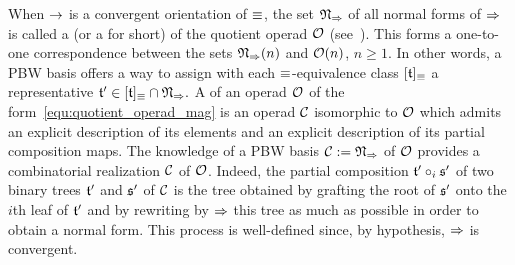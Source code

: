 When $\operatorname{\to}$ is a convergent orientation of $\operatorname{\equiv}$, the set
$\mathfrak{N}_{\operatorname{\Rightarrow}}$ of all normal forms of $\operatorname{\Rightarrow}$ is
called a  (or a  for
short) of the quotient operad $\mathcal{O}$ (see~\cite{Hof10,DK10}). This forms
a one-to-one correspondence between the sets
$\mathfrak{N}_{\operatorname{\Rightarrow}}(n)$ and $\mathcal{O}(n)$, $n \geq 1$. In other
words, a PBW basis offers a way to assign with each $\operatorname{\equiv}$-equivalence
class $[\mathfrak{t}]_{\operatorname{\equiv}}$ a representative
\begin{math}
    \mathfrak{t}' \in [\mathfrak{t}]_{\operatorname{\equiv}} \cap \mathfrak{N}_{\operatorname{\Rightarrow}}.
\end{math}
A  of an operad $\mathcal{O}$ of the
form~\eqref{equ:quotient_operad_mag} is an operad $\mathcal{C}$ isomorphic to
$\mathcal{O}$ which admits an explicit description of its elements and an
explicit description of its partial composition maps. The knowledge of a
PBW basis $\mathcal{C} := \mathfrak{N}_{\operatorname{\Rightarrow}}$ of $\mathcal{O}$ provides a
combinatorial realization $\mathcal{C}$ of $\mathcal{O}$. Indeed, the partial
composition $\mathfrak{t}' \circ_i \mathfrak{s}'$ of two binary trees $\mathfrak{t}'$ and
$\mathfrak{s}'$ of $\mathcal{C}$ is the tree obtained by grafting the root of $\mathfrak{s}'$
onto the $i$th leaf of $\mathfrak{t}'$ and by rewriting by $\operatorname{\Rightarrow}$ this
tree as much as possible in order to obtain a normal form. This process
is well-defined since, by hypothesis, $\operatorname{\Rightarrow}$ is convergent.
\medbreak


